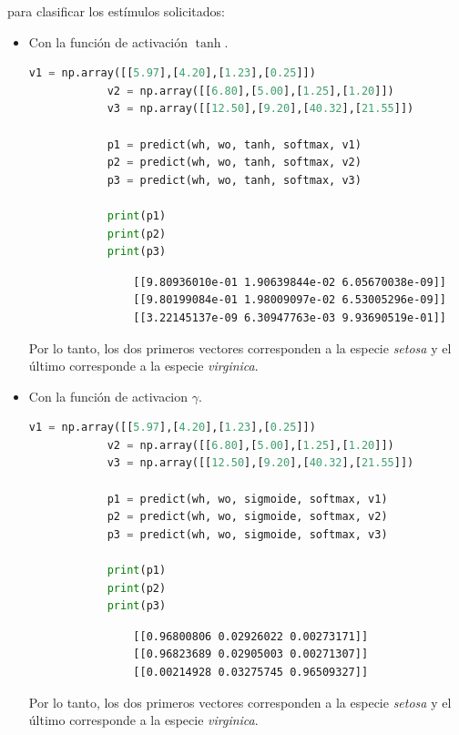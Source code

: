 \documentclass[letterpaper,11pt]{article}
\begin{document}
\begin{enumerate}
\begin{enumerate}
        para clasificar los estímulos solicitados:
        \begin{itemize}
            \item Con la función de activación $\tanh$.
            \begin{lstlisting}[language=Python]
            v1 = np.array([[5.97],[4.20],[1.23],[0.25]])
            v2 = np.array([[6.80],[5.00],[1.25],[1.20]])
            v3 = np.array([[12.50],[9.20],[40.32],[21.55]])

            p1 = predict(wh, wo, tanh, softmax, v1)
            p2 = predict(wh, wo, tanh, softmax, v2)
            p3 = predict(wh, wo, tanh, softmax, v3)

            print(p1)
            print(p2)
            print(p3)
            \end{lstlisting}

            \begin{verbatim}
                [[9.80936010e-01 1.90639844e-02 6.05670038e-09]]
                [[9.80199084e-01 1.98009097e-02 6.53005296e-09]]
                [[3.22145137e-09 6.30947763e-03 9.93690519e-01]]
            \end{verbatim}

            Por lo tanto, los dos primeros vectores corresponden a la especie 
            \textit{setosa} y el último corresponde a la especie 
            \textit{virginica}.

            \item Con la función de activacion $\gamma$.
            \begin{lstlisting}[language=Python]
            v1 = np.array([[5.97],[4.20],[1.23],[0.25]])
            v2 = np.array([[6.80],[5.00],[1.25],[1.20]])
            v3 = np.array([[12.50],[9.20],[40.32],[21.55]])

            p1 = predict(wh, wo, sigmoide, softmax, v1)
            p2 = predict(wh, wo, sigmoide, softmax, v2)
            p3 = predict(wh, wo, sigmoide, softmax, v3)

            print(p1)
            print(p2)
            print(p3)
            \end{lstlisting}

            \begin{verbatim}
                [[0.96800806 0.02926022 0.00273171]]
                [[0.96823689 0.02905003 0.00271307]]
                [[0.00214928 0.03275745 0.96509327]]
            \end{verbatim}

            Por lo tanto, los dos primeros vectores corresponden a la especie 
            \textit{setosa} y el último corresponde a la especie 
            \textit{virginica}.
        \end{itemize}


\end{enumerate}
\end{enumerate}
\end{document}
